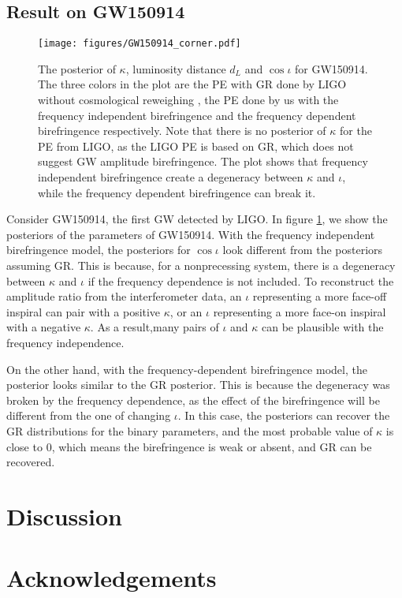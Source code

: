 \documentclass[reprint,amsmath,amssymb,aps,twocolumn]{aastex631}
\begin{document}


\subsection{Result on GW150914}

\begin{figure}[h]
    \texttt{[image: figures/GW150914\_corner.pdf]}
    \caption{
        The posterior of $\kappa$, luminosity distance $d_L$ and $\cos{\iota}$ for GW150914.
    The three colors in the plot are the PE with GR done by LIGO without cosmological reweighing \citep{GWTC-2.1, GWTC-3},
    the PE done by us with the frequency independent birefringence and the frequency dependent birefringence respectively.
    Note that there is no posterior of $\kappa$ for the PE from LIGO, as the LIGO PE is based on GR,
    which does not suggest GW amplitude birefringence. The plot shows that frequency independent birefringence create a degeneracy between $\kappa$ and $\iota$,
    while the frequency dependent birefringence can break it.
    }
    \label{fig:GW150914_corner}
\end{figure}

Consider GW150914, the first GW detected by LIGO. In figure \ref{fig:GW150914_corner}, we show the posteriors of the parameters of GW150914.
With the frequency independent birefringence model, the posteriors for $\cos\iota$ look different from the posteriors assuming GR.
This is because, for a nonprecessing system, there is a degeneracy between $\kappa$ and $\iota$ if the frequency dependence is not included.
To reconstruct the amplitude ratio from the interferometer data, an $\iota$ representing a more face-off inspiral can pair with a positive $\kappa$,
or an $\iota$ representing a more face-on inspiral with a negative $\kappa$.
As a result,many pairs of $\iota$ and $\kappa$ can be plausible with the frequency independence.

On the other hand, with the frequency-dependent birefringence model, the posterior looks similar to the GR posterior.
This is because the degeneracy was broken by the frequency dependence, as the effect of the birefringence will be different from the one of changing $\iota$.
In this case, the posteriors can recover the GR distributions for the binary parameters,
and the most probable value of $\kappa$ is close to $0$, which means the birefringence is weak or absent, and GR can be recovered.

\section{Discussion}
\label{sec:Discussion}






\section{Acknowledgements}
\label{sec:Acknowledgements}




\end{document}
